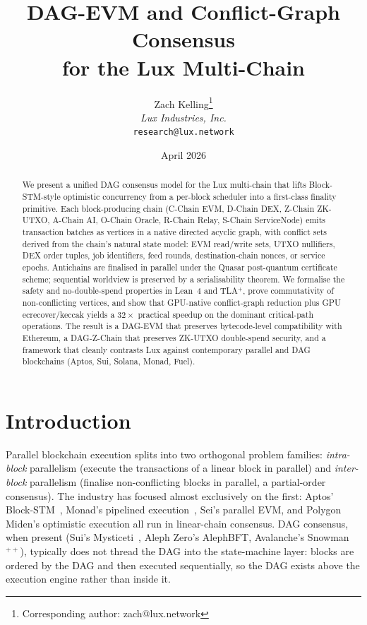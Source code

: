 \documentclass[11pt]{article}
\title{DAG-EVM and Conflict-Graph Consensus\\for the Lux Multi-Chain}
\author{
Zach Kelling\thanks{Corresponding author: zach@lux.network}\\
\textit{Lux Industries, Inc.}\\
\texttt{research@lux.network}
}
\date{April 2026}
\theoremstyle{definition}
\begin{document}
\luxcoverpage

\begin{abstract}
We present a unified DAG consensus model for the Lux multi-chain that lifts
Block-STM-style optimistic concurrency from a per-block scheduler into a
first-class finality primitive. Each block-producing chain (C-Chain EVM,
D-Chain DEX, Z-Chain ZK-UTXO, A-Chain AI, O-Chain Oracle, R-Chain Relay,
S-Chain ServiceNode) emits transaction batches as vertices in a native
directed acyclic graph, with conflict sets derived from the chain's natural
state model: EVM read/write sets, UTXO nullifiers, DEX order tuples,
job identifiers, feed rounds, destination-chain nonces, or service epochs.
Antichains are finalised in parallel under the Quasar post-quantum
certificate scheme; sequential worldview is preserved by a serialisability
theorem. We formalise the safety and no-double-spend properties in Lean~4
and TLA$^+$, prove commutativity of non-conflicting vertices, and show that
GPU-native conflict-graph reduction plus GPU ecrecover/keccak yields a
$32\times$ practical speedup on the dominant critical-path operations. The
result is a DAG-EVM that preserves bytecode-level compatibility with
Ethereum, a DAG-Z-Chain that preserves ZK-UTXO double-spend security, and a
framework that cleanly contrasts Lux against contemporary parallel and
DAG blockchains (Aptos, Sui, Solana, Monad, Fuel).
\end{abstract}

\tableofcontents
\newpage

\section{Introduction}

Parallel blockchain execution splits into two orthogonal problem families:
\emph{intra-block} parallelism (execute the transactions of a linear block
in parallel) and \emph{inter-block} parallelism (finalise non-conflicting
blocks in parallel, a partial-order consensus). The industry has focused
almost exclusively on the first: Aptos' Block-STM~\cite{blockstm}, Monad's
pipelined execution~\cite{monad}, Sei's parallel EVM, and Polygon Miden's
optimistic execution all run in linear-chain consensus. DAG consensus, when
present (Sui's Mysticeti~\cite{mysticeti}, Aleph Zero's AlephBFT,
Avalanche's Snowman$^{++}$), typically does not thread the DAG into the
state-machine layer: blocks are ordered by the DAG and then executed
sequentially, so the DAG exists above the execution engine rather than
inside it.
\end{document}
